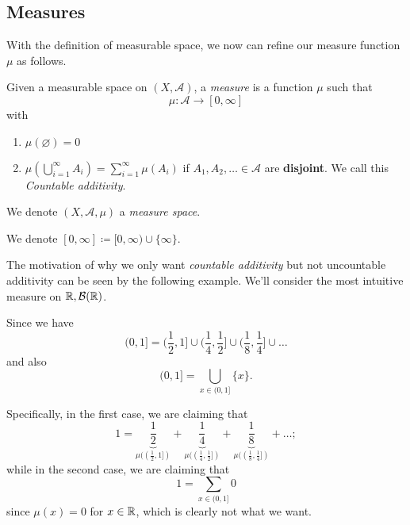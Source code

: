 \subsection{Measures}
With the definition of measurable space, we now can refine our measure function \(\mu\) as follows.
\begin{definition}[Measure]\label{def:measure}
	Given a measurable space on \((X, \mathcal{A}) \), a \emph{measure} is a function \(\mu\) such that
	\[
		\mu\colon \mathcal{A} \to [0, \infty]
	\]
	with
	\begin{enumerate}
		\item\label{def:measure-empty-measure} \(\mu(\varnothing ) = 0\)
		\item\label{def:measure-countable-additivity} \(\mu\left(\bigcup\limits_{i=1}^{\infty} A_{i}\right) = \sum\limits_{i=1}^{\infty}\mu(A_{i})\) if \(A_1, A_2, \ldots \in \mathcal{A}\)
		are \textbf{disjoint}. We call this \emph{Countable additivity}.
	\end{enumerate}
	We denote \((X, \mathcal{A} , \mu)\) a \emph{measure space}.
\end{definition}

\begin{notation}
	We denote \([0, \infty] \coloneqq [0, \infty) \cup \{\infty\}\).
\end{notation}

\begin{remark}
	The motivation of why we only want \emph{countable additivity} but not uncountable additivity can be seen by the following example. We'll consider
	the most intuitive measure on \(\mathbb{\MakeUppercase{R}} , \mathcal{B} (\mathbb{\MakeUppercase{R}})\).

	Since we have
	\[
		(0, 1] = (\frac{1}{2}, 1]\cup (\frac{1}{4}, \frac{1}{2}]\cup (\frac{1}{8}, \frac{1}{4}]\cup \ldots
	\]
	and also
	\[
		(0, 1] = \bigcup\limits_{x\in (0, 1]}\{x\}.
	\]

	Specifically, in the first case, we are claiming that
	\[
		1 = \underbrace{\frac{1}{2}}_{\mu((\frac{1}{2}, 1])} + \underbrace{\frac{1}{4}}_{\mu((\frac{1}{4}, \frac{1}{2}])} + \underbrace{\frac{1}{8}}_{\mu((\frac{1}{8}, \frac{1}{4}])}  + \ldots  ;
	\]
	while in the second case, we are claiming that
	\[
		1 = \sum\limits_{x\in(0, 1]} 0
	\]
	since \(\mu(x) = 0\) for \(x\in \mathbb{\MakeUppercase{R}} \), which is clearly not what we want.
\end{remark}

